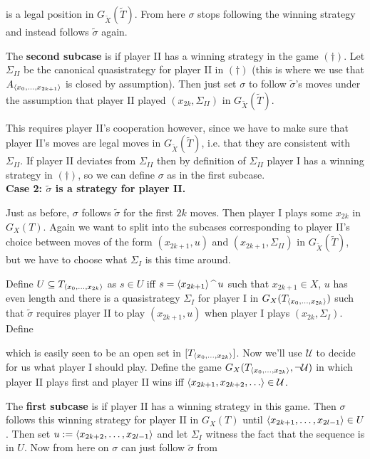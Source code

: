 {is a legal position in $G_{\tilde X}(\tilde T)$. From here $\sigma$ stops following the winning strategy and instead follows $\tilde\sigma$ again.

\qquad The \textbf{second subcase} is if player II has a winning strategy in the game $(\dagger)$. Let $\Sigma_{II}$ be the canonical quasistrategy for player II in $(\dagger)$ (this is where we use that $A_{\langle x_0,\hdots,x_{2k+1}\rangle}$ is closed by assumption). Then just set $\sigma$ to follow $\tilde\sigma$'s moves under the assumption that player II played $(x_{2k},\Sigma_{II})$ in $G_{\tilde X}(\tilde T)$.

\qquad This requires player II's cooperation however, since we have to make sure that player II's moves are legal moves in $G_{\tilde X}(\tilde T)$, i.e. that they are consistent with $\Sigma_{II}$. If player II deviates from $\Sigma_{II}$ then by definition of $\Sigma_{II}$ player I has a winning strategy in $(\dagger)$, so we can define $\sigma$ as in the first subcase.\\

\textbf{Case 2: $\tilde\sigma$ is a strategy for player II.}

Just as before, $\sigma$ follows $\tilde\sigma$ for the first $2k$ moves. Then player I plays some $x_{2k}$ in $G_X(T)$. Again we want to split into the subcases corresponding to player II's choice between moves of the form $(x_{2k+1},u)$ and $(x_{2k+1},\Sigma_{II})$ in $G_{\tilde X}(\tilde T)$, but we have to choose what $\Sigma_I$ is this time around.

\qquad Define $U\subseteq T_{\langle x_0,\hdots,x_{2k}\rangle}$ as $s\in U$ iff $s=\langle x_{2k+1}\rangle\operatorname{\text{\textasciicircum}} u$ such that $x_{2k+1}\in X$, $u$ has even length and there is a quasistrategy $\Sigma_I$ for player I in $G_X(T_{\langle x_0,\hdots,x_{2k}\rangle})$ such that $\tilde\sigma$ requires player II to play $(x_{2k+1},u)$ when player I plays $(x_{2k},\Sigma_I)$. Define

which is easily seen to be an open set in $[T_{\langle x_0,\hdots,x_{2k}\rangle}]$. Now we'll use $\mathcal{U}$ to decide for us what player I should play. Define the game $G_X(T_{\langle x_0,\hdots,x_{2k}\rangle},\lnot\mathcal{U})$ in which player II plays first and player II wins iff $\langle x_{2k+1},x_{2k+2},\hdots\rangle\in\mathcal{U}$.

\qquad The \textbf{first subcase} is if player II has a winning strategy in this game. Then $\sigma$ follows this winning strategy for player II in $G_X(T)$ until $\langle x_{2k+1},\hdots,x_{2l-1}\rangle\in U$. Then set $u:=\langle x_{2k+2},\hdots,x_{2l-1}\rangle$ and let $\Sigma_I$ witness the fact that the sequence is in $U$. Now from here on $\sigma$ can just follow $\tilde\sigma$ from

}
